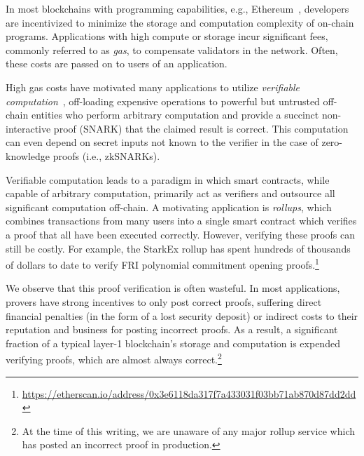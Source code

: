 In most blockchains with programming capabilities, e.g., Ethereum~\cite{ethereum_yellowpaper}, developers are incentivized to minimize the storage and computation complexity of on-chain programs. Applications with high compute or storage incur significant fees, commonly referred to as \emph{gas}, to compensate validators in the network. Often, these costs are passed on to users of an application. 

High gas costs have motivated many applications to utilize \emph{verifiable computation}~\cite{C:GenGenPar10}, off-loading expensive operations to powerful but untrusted off-chain entities who perform arbitrary computation and provide a succinct non-interactive proof (SNARK) that the claimed result is correct.
This computation can even depend on secret inputs not known to the verifier in the case of zero-knowledge proofs (i.e., zkSNARKs).

Verifiable computation leads to a paradigm in which smart contracts, while capable of arbitrary computation, primarily act as verifiers and outsource all significant computation off-chain. A motivating application is \emph{rollups}, which combines transactions from many users into a single smart contract which verifies a proof that all have been executed correctly. However, verifying these proofs can still be costly. For example, the StarkEx rollup 
has spent hundreds of thousands of dollars to date to verify FRI polynomial commitment opening proofs.\footnote{\url{https://etherscan.io/address/0x3e6118da317f7a433031f03bb71ab870d87dd2dd}}

We observe that this proof verification is often wasteful. In most applications, provers have strong incentives to only post correct proofs, suffering direct financial penalties (in the form of a lost security deposit) or indirect costs to their reputation and business for posting incorrect proofs. As a result, a significant fraction of a typical layer-1 blockchain's storage and computation is expended verifying proofs, which are almost always correct.\footnote{At the time of this writing, we are unaware of any major rollup service which has posted an incorrect proof in production.}

